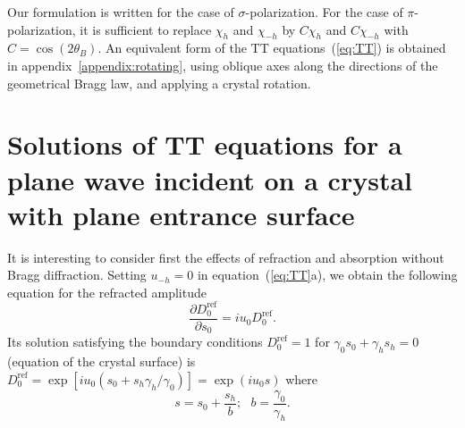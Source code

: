 \documentclass{iucr}
\begin{document}
Our formulation is written for the case of $\sigma$-polarization. For the case of $\pi$-polarization, it is sufficient to replace $\chi_h$ and $\chi_{-h}$ by $C\chi_h$ and $C\chi_{-h}$ with $C=\cos(2\theta_B)$.
An equivalent form of the TT equations~(\ref{eq:TT}) is obtained in appendix~\ref{appendix:rotating}, using oblique axes along the directions of the geometrical Bragg law, and applying a crystal rotation.

%
\section{Solutions of TT equations  for a plane wave incident on a crystal with plane entrance surface}
\label{sec:TTsolutions}

It is interesting to consider first the effects of refraction and absorption without Bragg diffraction. 
Setting $u_{-h}=0$ in equation~(\ref{eq:TT}a), we obtain the following equation for the refracted amplitude 
\begin{equation}\label{eq:refraction}
\frac{\partial D_0^{\text{ref}}}{\partial s_0} = i u_0 D_0^{\text{ref}}.
\end{equation}
Its solution satisfying the boundary conditions $D_0^{\text{ref}}=1$ for  $\gamma_0 s_0 + \gamma_h s_h =0$ (equation of the crystal surface) is $D_0^{\text{ref}}= \exp[i u_0 (s_0 + s_h \gamma_h/\gamma_0)]=\exp(i u_0 s)$ where
\begin{equation}\label{eq:b}
s=s_0+\frac{s_h}{b}; ~~~ b = \frac{\gamma_0}{\gamma_h}.    
\end{equation}
\end{document}
